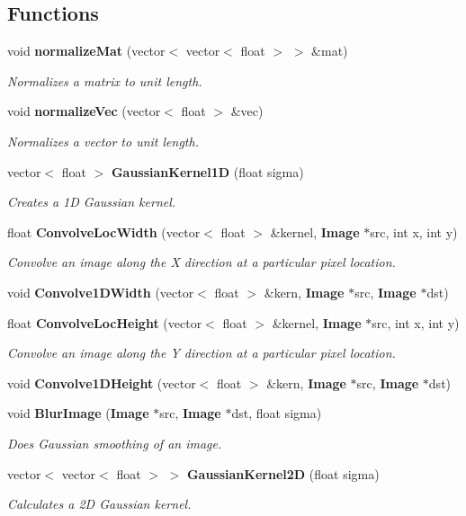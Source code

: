 \subsection*{Functions}
\begin{DoxyCompactItemize}
\item 
void {\bf normalize\+Mat} (vector$<$ vector$<$ float $>$ $>$ \&mat)
\begin{DoxyCompactList}\small\item\em Normalizes a matrix to unit length. \end{DoxyCompactList}\item 
void {\bf normalize\+Vec} (vector$<$ float $>$ \&vec)
\begin{DoxyCompactList}\small\item\em Normalizes a vector to unit length. \end{DoxyCompactList}\item 
vector$<$ float $>$ {\bf Gaussian\+Kernel1D} (float sigma)
\begin{DoxyCompactList}\small\item\em Creates a 1D Gaussian kernel. \end{DoxyCompactList}\item 
float {\bf Convolve\+Loc\+Width} (vector$<$ float $>$ \&kernel, {\bf Image} $\ast$src, int x, int y)
\begin{DoxyCompactList}\small\item\em Convolve an image along the X direction at a particular pixel location. \end{DoxyCompactList}\item 
void {\bf Convolve1\+D\+Width} (vector$<$ float $>$ \&kern, {\bf Image} $\ast$src, {\bf Image} $\ast$dst)
\item 
float {\bf Convolve\+Loc\+Height} (vector$<$ float $>$ \&kernel, {\bf Image} $\ast$src, int x, int y)
\begin{DoxyCompactList}\small\item\em Convolve an image along the Y direction at a particular pixel location. \end{DoxyCompactList}\item 
void {\bf Convolve1\+D\+Height} (vector$<$ float $>$ \&kern, {\bf Image} $\ast$src, {\bf Image} $\ast$dst)
\item 
void {\bf Blur\+Image} ({\bf Image} $\ast$src, {\bf Image} $\ast$dst, float sigma)
\begin{DoxyCompactList}\small\item\em Does Gaussian smoothing of an image. \end{DoxyCompactList}\item 
vector$<$ vector$<$ float $>$ $>$ {\bf Gaussian\+Kernel2D} (float sigma)
\begin{DoxyCompactList}\small\item\em Calculates a 2D Gaussian kernel. \end{DoxyCompactList}\end{DoxyCompactItemize}


